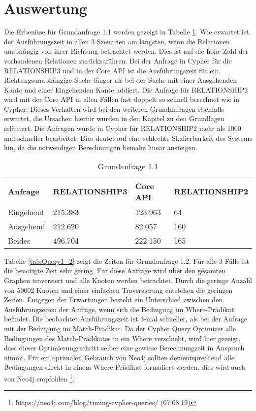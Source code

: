 \section{Auswertung}
Die Erbenisse für Grundanfrage 1.1 werden gezeigt in Tabelle \ref{tab:Query1_1}. Wie erwartet ist der Ausführungszeit in allen 3 Szenarien am längsten, wenn die Relationen unabhängig von ihrer Richtung betrachtet werden. Dies ist auf die hohe Zahl der vorhandenen Relationen zurückzuführen. Bei der Anfrage in Cypher für die RELATIONSHIP3 und in der Core API ist die Ausführungszeit für ein Richtungsunabhängige Suche länger als bei der Suche mit einer Ausgehenden Kante und einer Eingehenden Kante addiert. \newline
Die Anfrage für RELATIONSHIP3 wird mit der Core API in  allen Fällen fast doppelt so schnell berechnet wie in Cypher. Dieses Verhalten wird bei den weiteren Grundanfragen ebenfalls erwartet, die Ursachen hierfür wurden in den Kapitel zu den Grundlagen erläutert. \newline
Die Anfragen wurde in Cypher für RELATIONSHIP2 mehr als 1000 mal schneller bearbeitet. Dies deutet auf eine schlechte Skalierbarkeit des Systems hin, da die notwendigen Berechnungen beinahe linear ansteigen. 
\FloatBarrier  
\begin{table}[h]
\centering
\begin{tabular}{ |p{3cm}||p{3cm}|p{3cm}|p{3cm}|  }
	\hline
	Anfrage& RELATIONSHIP3 &Core API&RELATIONSHIP2\\
	\hline
	Eingehend   & 215.383    &123.963&  64\\
	Ausgehend&    212.620  & 82.057   & 160\\
	Beides&496.704 & 222.150&  165\\
	\hline
\end{tabular}
\caption{Grundanfrage 1.1}
\label{tab:Query1_1}
\end{table}
\FloatBarrier
Tabelle \ref{tab:Query1_2} zeigt die Zeiten für Grundanfrage 1.2. Für alle 3 Fälle ist die benötigte Zeit sehr gering. Für diese Anfrage wird über den gesamten Graphen traversiert  und alle Knoten werden betrachtet. Durch die geringe Anzahl von 50002 Knoten und einer einfachen Traversierung entstehen die geringen Zeiten. \newline Entgegen der Erwartungen besteht ein Unterschied zwischen den Ausführungzeiten der Anfrage, wenn sich die Bedingung im Where-Prädikat befindet. Die beobachtet Ausführungszeit ist 3-mal schneller, als bei der Anfrage mit der Bedingung im Match-Prädikat. Da der Cypher Query Optimizer alle Bedingungen des Match-Prädikates in ein Where verschiebt, wird hier gezeigt, dass dieser Optimierungsschritt selber eine gewisse Berechnungzeit in Anspruch nimmt. Für ein optimalen Gebrauch von Neo4j sollten dementsprechend alle Bedingungen direkt in einem Where-Prädikat formuliert werden, dies wird auch von Neo4j empfohlen \footnote{https://neo4j.com/blog/tuning-cypher-queries/ (07.08.19)}. 
